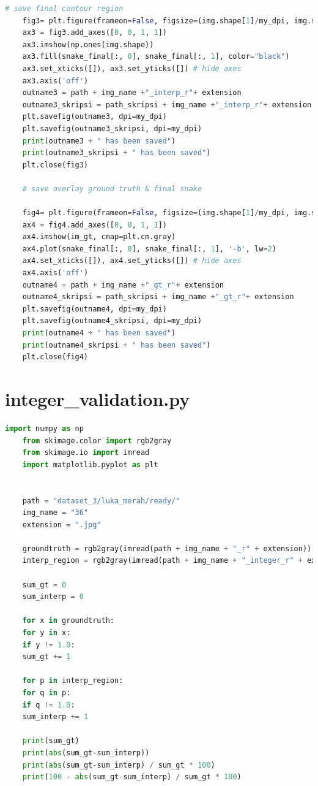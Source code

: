\begin{lstlisting}[language=Python, basicstyle=\tiny]
	# save final contour region
	fig3= plt.figure(frameon=False, figsize=(img.shape[1]/my_dpi, img.shape[0]/my_dpi), dpi=my_dpi)
	ax3 = fig3.add_axes([0, 0, 1, 1])
	ax3.imshow(np.ones(img.shape))
	ax3.fill(snake_final[:, 0], snake_final[:, 1], color="black")
	ax3.set_xticks([]), ax3.set_yticks([]) # hide axes
	ax3.axis('off')
	outname3 = path + img_name +"_interp_r"+ extension
	outname3_skripsi = path_skripsi + img_name +"_interp_r"+ extension
	plt.savefig(outname3, dpi=my_dpi)
	plt.savefig(outname3_skripsi, dpi=my_dpi)
	print(outname3 + " has been saved")
	print(outname3_skripsi + " has been saved")
	plt.close(fig3)
	
	# save overlay ground truth & final snake
	
	fig4= plt.figure(frameon=False, figsize=(img.shape[1]/my_dpi, img.shape[0]/my_dpi), dpi=my_dpi)
	ax4 = fig4.add_axes([0, 0, 1, 1])
	ax4.imshow(im_gt, cmap=plt.cm.gray)
	ax4.plot(snake_final[:, 0], snake_final[:, 1], '-b', lw=2)
	ax4.set_xticks([]), ax4.set_yticks([]) # hide axes
	ax4.axis('off')
	outname4 = path + img_name +"_gt_r"+ extension
	outname4_skripsi = path_skripsi + img_name +"_gt_r"+ extension
	plt.savefig(outname4, dpi=my_dpi)
	plt.savefig(outname4_skripsi, dpi=my_dpi)
	print(outname4 + " has been saved")
	print(outname4_skripsi + " has been saved")
	plt.close(fig4)
\end{lstlisting}

\section{integer\_validation.py}
\begin{lstlisting}[language=Python, basicstyle=\tiny]
	import numpy as np
	from skimage.color import rgb2gray
	from skimage.io import imread
	import matplotlib.pyplot as plt
	
	
	path = "dataset_3/luka_merah/ready/"
	img_name = "36"
	extension = ".jpg"
	
	groundtruth = rgb2gray(imread(path + img_name + "_r" + extension))
	interp_region = rgb2gray(imread(path + img_name + "_integer_r" + extension))
	
	sum_gt = 0
	sum_interp = 0
	
	for x in groundtruth:
	for y in x:
	if y != 1.0:
	sum_gt += 1
	
	for p in interp_region:
	for q in p:
	if q != 1.0:
	sum_interp += 1
	
	print(sum_gt)
	print(abs(sum_gt-sum_interp))
	print(abs(sum_gt-sum_interp) / sum_gt * 100)
	print(100 - abs(sum_gt-sum_interp) / sum_gt * 100)
\end{lstlisting}


